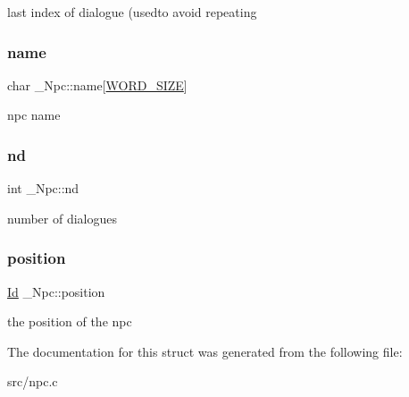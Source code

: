 last index of dialogue (usedto avoid repeating \mbox{\label{struct__Npc_a0a5fbaf3e3f16874eb2e64c8a8f359de}} 
\subsubsection{\texorpdfstring{name}{name}}
{\footnotesize\ttfamily char \+\_\+\+Npc\+::name\mbox{[}\hyperlink{types_8h_a92ed8507d1cd2331ad09275c5c4c1c89}{W\+O\+R\+D\+\_\+\+S\+I\+ZE}\mbox{]}}

npc name \mbox{\label{struct__Npc_a6301db399673c2fd01e898893d7048f4}} 
\subsubsection{\texorpdfstring{nd}{nd}}
{\footnotesize\ttfamily int \+\_\+\+Npc\+::nd}

number of dialogues \mbox{\label{struct__Npc_ad99151357fe871205b1531858fa13748}} 
\subsubsection{\texorpdfstring{position}{position}}
{\footnotesize\ttfamily \hyperlink{types_8h_a845e604fb28f7e3d97549da3448149d3}{Id} \+\_\+\+Npc\+::position}

the position of the npc 

The documentation for this struct was generated from the following file\+:\begin{DoxyCompactItemize}
\item 
src/npc.\+c\end{DoxyCompactItemize}
